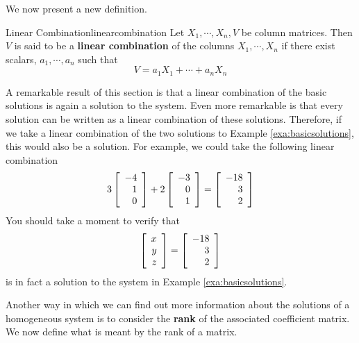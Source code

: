 We now present a new definition. 

\begin{definition}{Linear Combination}{linearcombination}
Let $X_1,\cdots ,X_n,V$ be column matrices. Then 
$V$ is said to be a \textbf{linear combination }
of the columns $X_1,\cdots , X_n $ 
if there exist scalars, $a_{1},\cdots ,a_{n}$ such
that
\begin{equation*}
V = a_1 X_1 + \cdots + a_n X_n
\end{equation*}
\end{definition}

A remarkable result of this section is that a linear combination of the basic solutions is again a solution to the system.
Even more remarkable is that every solution can be written as a linear combination of these solutions. 
Therefore, if we take a linear combination of the two solutions to Example \ref{exa:basicsolutions},
this would also be a solution. 
For example, we could take the following linear combination
\begin{equation*}
3
\left[
\begin{array}{r}
-4 \\
1 \\
0
\end{array}
\right]
+
2
\left[
\begin{array}{r}
-3 \\
0\\
1
\end{array}
\right]
 =
\left[
\begin{array}{r}
-18 \\
3 \\
2
\end{array}
\right]
\end{equation*}
You should take a moment to verify that
\begin{equation*}
\left[
\begin{array}{r}
x \\
y \\
z
\end{array}
\right]
=
\left[
\begin{array}{r}
-18 \\
3 \\
2
\end{array}
\right]
\end{equation*}
is in fact a solution to the system in Example \ref{exa:basicsolutions}.

Another way in which we can find out more information about the solutions of 
a homogeneous system is to consider the \textbf{rank} of the associated coefficient matrix. We
now define what is meant by the rank of a matrix.


